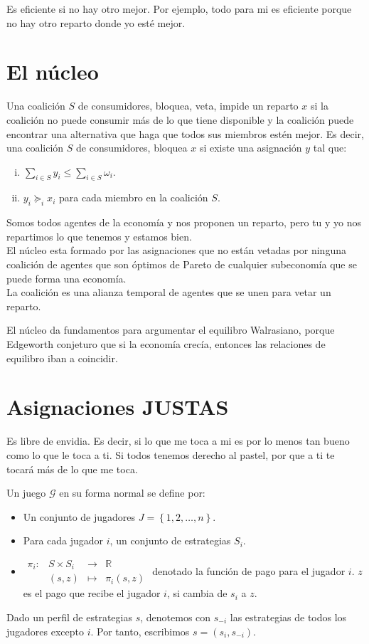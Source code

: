Es eficiente si no hay otro mejor. Por ejemplo, todo para mi es eficiente porque no hay otro reparto donde yo esté mejor.\\


\section{El núcleo}
Una coalición $S$ de consumidores, bloquea, veta, impide un reparto $x$ si la coalición no puede consumir más de lo que tiene disponible y la coalición puede encontrar una alternativa que haga que todos sus miembros estén mejor. Es decir, una coalición $S$ de consumidores, bloquea $x$ si existe una asignación $y$ tal que:
\begin{enumerate}[i)]
    \item $\sum_{i\in S} y_i\leq \sum_{i\in S} \omega_i$.
    \item $y_i\succeq_i x_i$ para cada miembro en la coalición $S$.
\end{enumerate}

Somos todos agentes de la economía y nos proponen un reparto, pero tu y yo nos repartimos lo que tenemos y estamos bien.\\

El núcleo esta formado por las asignaciones que no están vetadas por ninguna coalición de agentes que son óptimos de Pareto de cualquier subeconomía que se puede forma una economía.\\

La coalición es una alianza temporal de agentes que se unen para vetar un reparto.

El núcleo da fundamentos para argumentar el equilibro Walrasiano, porque Edgeworth conjeturo que si la economía crecía, entonces las relaciones de equilibro iban a coincidir. 


\section{Asignaciones JUSTAS}
Es libre de envidia. Es decir, si lo que me toca a mi es por lo menos tan bueno como lo que le toca a ti. Si todos tenemos derecho al pastel, por que a ti te tocará más de lo que me toca.


Un juego $\mathcal{G}$ en su forma normal se define por:
\begin{itemize}
	\item Un conjunto de jugadores $J=\left\{1,2,\ldots,n\right\}$.
	\item Para cada jugador $i$, un conjunto de estrategias $S_i$.
	\item $\begin{array}{rrcl}
		\pi_i:&S\times S_i &\to& \mathbb{R}\\
		      &(s,z) &\mapsto& \pi_i(s,z)
	\end{array}$ denotado la función de pago para el jugador $i$. $z$ es el pago que recibe el jugador $i$, si cambia de $s_i$ a $z$.
\end{itemize}
Dado un perfil de estrategias $s$, denotemos con $s_{-i}$ las estrategias de todos los jugadores excepto $i$. Por tanto, escribimos $s=(s_i,s_{-i})$.\\

